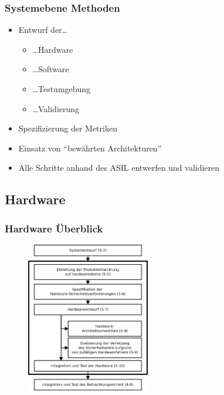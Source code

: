 \documentclass[]{beamer}
\begin{document}
\begin{frame}
\frametitle{Systemebene Methoden}

\begin{itemize}
    \item Entwurf der\dots
    \begin{itemize}
        \item \dots Hardware
        \item \dots Software
        \item \dots Testumgebung
        \item \dots Validierung
    \end{itemize}
    \item Spezifizierung der Metriken
    \item Einsatz von "`bewährten Architekturen"'
    \item Alle Schritte anhand des ASIL entwerfen und validieren
\end{itemize}

\end{frame}





\subsection{Hardware}
\begin{frame}
\frametitle{Hardware Überblick}

\begin{figure}
   \includegraphics[width=5.4cm]{Abb_6_4}
\end{figure}

\end{frame}
\end{document}
